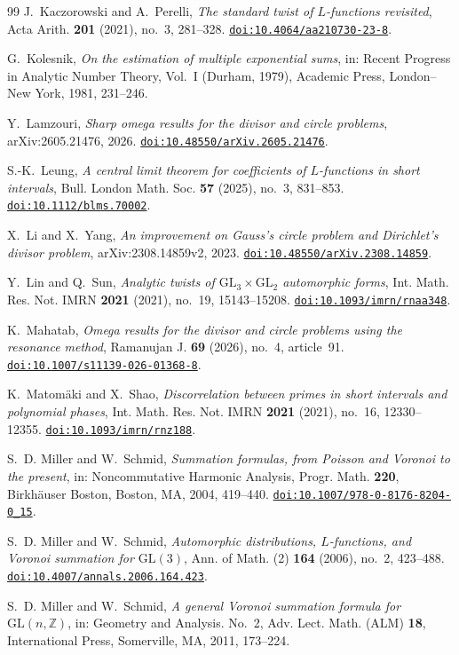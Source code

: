 \documentclass[11pt]{amsart}
\theoremstyle{plain}
\theoremstyle{definition}
\theoremstyle{remark}
\newcommand{\doi}[1]{\href{https://doi.org/#1}{\nolinkurl{doi:#1}}}
\numberwithin{equation}{section}
\begin{document}
\begin{thebibliography}{99}
J.~Kaczorowski and A.~Perelli,
\emph{The standard twist of $L$-functions revisited},
Acta Arith. \textbf{201} (2021), no.~3, 281--328.
\doi{10.4064/aa210730-23-8}.

G.~Kolesnik,
\emph{On the estimation of multiple exponential sums},
in: Recent Progress in Analytic Number Theory, Vol.~I (Durham, 1979),
Academic Press, London--New York, 1981, 231--246.

Y.~Lamzouri,
\emph{Sharp omega results for the divisor and circle problems},
arXiv:2605.21476, 2026.
\doi{10.48550/arXiv.2605.21476}.

S.-K.~Leung,
\emph{A central limit theorem for coefficients of $L$-functions in short intervals},
Bull. London Math. Soc. \textbf{57} (2025), no.~3, 831--853.
\doi{10.1112/blms.70002}.

X.~Li and X.~Yang,
\emph{An improvement on Gauss's circle problem and Dirichlet's divisor problem},
arXiv:2308.14859v2, 2023.
\doi{10.48550/arXiv.2308.14859}.

Y.~Lin and Q.~Sun,
\emph{Analytic twists of $\mathrm{GL}_3\times\mathrm{GL}_2$ automorphic forms},
Int. Math. Res. Not. IMRN \textbf{2021} (2021), no.~19, 15143--15208.
\doi{10.1093/imrn/rnaa348}.

K.~Mahatab,
\emph{Omega results for the divisor and circle problems using the resonance method},
Ramanujan J. \textbf{69} (2026), no.~4, article~91.
\doi{10.1007/s11139-026-01368-8}.

K.~Matom\"aki and X.~Shao,
\emph{Discorrelation between primes in short intervals and polynomial
phases},
Int. Math. Res. Not. IMRN \textbf{2021} (2021), no.~16,
12330--12355.
\doi{10.1093/imrn/rnz188}.

S.~D. Miller and W.~Schmid,
\emph{Summation formulas, from Poisson and Voronoi to the present},
in: Noncommutative Harmonic Analysis, Progr. Math. \textbf{220},
Birkh\"auser Boston, Boston, MA, 2004, 419--440.
\doi{10.1007/978-0-8176-8204-0_15}.

S.~D. Miller and W.~Schmid,
\emph{Automorphic distributions, $L$-functions, and Voronoi summation for $\mathrm{GL}(3)$},
Ann. of Math. (2) \textbf{164} (2006), no.~2, 423--488.
\doi{10.4007/annals.2006.164.423}.

S.~D. Miller and W.~Schmid,
\emph{A general Voronoi summation formula for $\mathrm{GL}(n,\mathbb Z)$},
in: Geometry and Analysis. No.~2, Adv. Lect. Math. (ALM) \textbf{18},
International Press, Somerville, MA, 2011, 173--224.


\end{thebibliography}
\end{document}
